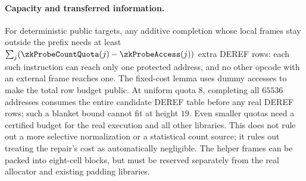 \paragraph{Capacity and transferred information.} For deterministic public targets, any additive completion whose local frames stay outside the prefix needs at least $\sum_j(\zkProbeCountQuota(j)-\zkProbeAccess(j))$ extra DEREF rows: each such instruction can reach only one protected address, and no other opcode with an external frame reaches one. The fixed-cost lemma uses dummy accesses to make the total row budget public. At uniform quota $8$, completing all $65536$ addresses consumes the entire candidate DEREF table before any real DEREF rows; such a blanket bound cannot fit at height $19$. Even smaller quotas need a certified budget for the real execution and all other libraries. This does not rule out a more selective normalization or a statistical count source; it rules out treating the repair's cost as automatically negligible. The helper frames can be packed into eight-cell blocks, but must be reserved separately from the real allocator and existing padding libraries.

